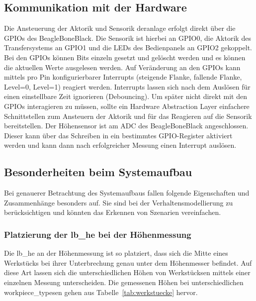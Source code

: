\subsection{Kommunikation mit der Hardware}

Die Ansteuerung der Aktorik und Sensorik der\gls{anlage} erfolgt direkt über die GPIOs des BeagleBoneBlack.
Die Sensorik ist hierbei an GPIO0, die Aktorik des Transfersystems an GPIO1 und die LEDs des Bedienpanels an GPIO2
gekoppelt.
Bei den GPIOs können Bits einzeln gesetzt und gelöscht werden und es können die aktuellen Werte ausgelesen werden.
Auf Veränderung an den GPIOs kann mittels pro Pin konfigurierbarer Interrupts (steigende Flanke, fallende Flanke,
Level=0, Level=1) reagiert werden.
Interrupts lassen sich nach dem Auslösen für einen einstellbare Zeit ignorieren (Debouncing).
Um später nicht direkt mit den GPIOs interagieren zu müssen, sollte ein Hardware Abstraction Layer
einfachere Schnittstellen zum Ansteuern der Aktorik und für das Reagieren auf die Sensorik bereitstellen.
Der Höhensensor ist am ADC des BeagleBoneBlack angeschlossen. Dieser kann über das Schreiben in ein
bestimmtes GPIO-Register aktiviert werden und kann dann nach erfolgreicher Messung einen Interrupt auslösen.

\subsection{Besonderheiten beim Systemaufbau}

Bei genauerer Betrachtung des Systemaufbaus fallen folgende Eigenschaften und Zusammenhänge besonders auf.
Sie sind bei der Verhaltensmodellierung zu berücksichtigen und könnten das Erkennen von Szenarien vereinfachen.

\subsubsection{Platzierung der \gls{lb_he} bei der Höhenmessung}

Die \gls{lb_he} an der Höhenmessung ist so platziert, dass sich die Mitte eines \Gls{Werkstück}s bei ihrer
Unterbrechung genau unter dem Höhenmesser befindet.
Auf diese Art lassen sich die unterschiedlichen Höhen von \Glspl{Werkstück}en mittels einer einzelnen Messung unterscheiden.
Die gemessenen Höhen bei unterschiedlichen \glspl{workpiece_type}en gehen aus Tabelle~\ref{tab:werkstuecke} hervor.

